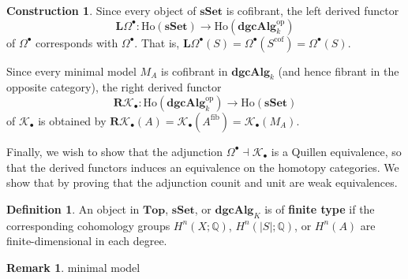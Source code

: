 \documentclass[psamsfonts]{amsart}
\theoremstyle{definition}
\newtheorem{defn}{Definition}[section]
\newtheorem{con}{Construction}[section]
\newtheorem{rem}{Remark}[section]
\newcommand{\Q}{\mathbb{Q}}
\newcommand{\Top}{\mathbf{Top}}
\newcommand{\sSet}{\mathbf{sSet}}
\newcommand{\dgcAlg}{\mathbf{dgcAlg}}
\newcommand{\Ho}{\mathrm{Ho}}
\numberwithin{equation}{section}
\begin{document}
\begin{con}
Since every object of $\sSet$ is cofibrant, the left derived functor
\[\mathbf{L}\Omega^\bullet:\Ho(\sSet)\to\Ho(\dgcAlg_k^\textrm{op})\]
of $\Omega^\bullet$ corresponds with $\Omega^\bullet$. That is, $\mathbf{L}\Omega^\bullet(S)=\Omega^\bullet(S^\textrm{cof})=\Omega^\bullet(S)$.

Since every minimal model $M_A$ is cofibrant in $\dgcAlg_k$ (and hence fibrant in the opposite category), the right derived functor
\[\mathbf{R}\mathcal{K}_\bullet:\Ho(\dgcAlg_k^\textrm{op})\to\Ho(\sSet)\]
of $\mathcal{K}_\bullet$ is obtained by $\mathbf{R}\mathcal{K}_\bullet(A)=\mathcal{K}_\bullet(A^\textrm{fib})=\mathcal{K}_\bullet(M_A)$.
\end{con}

Finally, we wish to show that the adjunction $\Omega^\bullet\dashv\mathcal{K}_\bullet$ is a Quillen equivalence, so that the derived functors induces an equivalence on the homotopy categories. We show that by proving that the adjunction counit and unit are weak equivalences.

\begin{defn}
An object in $\Top$, $\sSet$, or $\dgcAlg_K$ is of \textbf{finite type} if the corresponding cohomology groups $H^n(X;\Q)$, $H^n(|S|;\Q)$, or $H^n(A)$ are finite-dimensional in each degree.
\end{defn}

\begin{rem}
minimal model
\end{rem}
\end{document}
